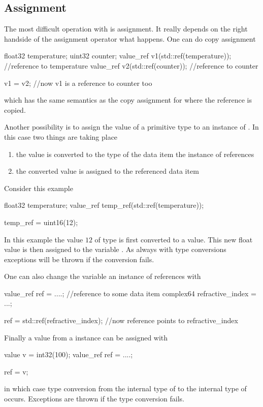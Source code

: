 \subsection{Assignment}

The most difficult operation with  is assignment. It really
depends on the right handside of the assignment operator what happens. 
One can do copy assignment
\begin{cppcode}
float32 temperature; 
uint32  counter;
value_ref v1(std::ref(temperature)); //reference to temperature
value_ref v2(std::ref(counter));     //reference to counter

v1 = v2; //now v1 is a reference to counter too
\end{cppcode}
which has the same semantics as the copy assignment for
 where the reference is copied. 

Another possibility is to assign the value of a primitive type to an 
instance of . In this case two things are taking place
\begin{enumerate}
\item the value is converted to the type of the data item the instance 
of  references
\item the converted value is assigned to the referenced data item
\end{enumerate}
Consider this example
\begin{cppcode}
float32 temperature;
value_ref temp_ref(std::ref(temperature));

temp_ref = uint16(12);
\end{cppcode}
In this example the value $12$ of type  is first converted to 
a  value. This new float value is then assigned to the variable 
. As always with type conversions exceptions will be 
thrown if the conversion fails.

One can also change the variable an instance of  references 
with
\begin{cppcode}
value_ref ref = ....;    //reference to some data item
complex64 refractive_index = ...;

ref = std::ref(refractive_index);  //now reference points to refractive_index
\end{cppcode}
Finally a value from a  instance can be assigned with
\begin{cppcode}
value v = int32(100);
value_ref ref = ....;

ref = v;
\end{cppcode}
in which case type conversion from the internal type of  to the internal 
type of  occurs. Exceptions are thrown if the type conversion fails.


